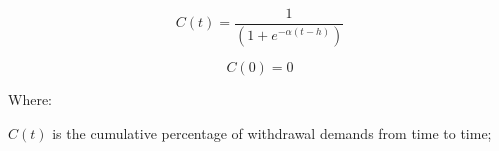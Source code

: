 \documentclass{mcmthesis}	%
\begin{document}


\begin{equation}\label{1}
C(t) = \frac{1}{{(1 + {e^{ - \alpha (t - h)}})}}%
\end{equation}

\begin{equation}\label{2}
C(0) = 0
\end{equation}

Where:

$C(t)$ is the cumulative percentage of withdrawal demands from time to time;

%
%
%
%
%
%
%
\end{document}

